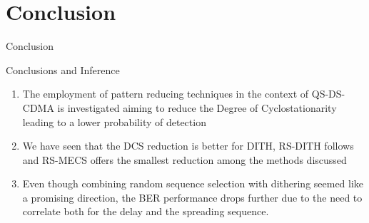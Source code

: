 \documentclass{beamer}
\begin{document}
\section{Conclusion}
\begin{frame}{Conclusion}
    \begin{block}{Conclusions and Inference}
    \begin{enumerate}
     \item The employment of pattern reducing techniques in the context of QS-DS-CDMA is investigated aiming to reduce the Degree of Cyclostationarity leading to a lower probability of detection
\item We have seen that the DCS reduction is better for DITH, RS-DITH follows and RS-MECS offers the smallest reduction among the methods discussed
\item Even though combining random sequence selection with dithering seemed like a promising direction, the BER performance drops further due to the need to correlate both for the delay and the spreading sequence.

    \end{enumerate}
    \end{block}
\end{frame}
\end{document}
